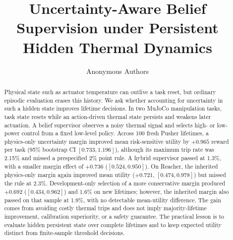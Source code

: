 \documentclass[10pt]{article}
\title{Uncertainty-Aware Belief Supervision under Persistent Hidden Thermal
Dynamics}
\author{Anonymous Authors}
\begin{document}
\maketitle

\begin{abstract}
Physical state such as actuator temperature can outlive a task reset, but
ordinary episodic evaluation erases this history. We ask whether accounting for
uncertainty in such a hidden state improves lifetime decisions. In two MuJoCo
manipulation tasks, task state resets while an action-driven thermal state
persists and weakens later actuation. A belief supervisor observes a noisy
thermal signal and selects high- or low-power control from a fixed low-level
policy. Across 100 fresh Pusher lifetimes, a physics-only uncertainty margin
improved mean risk-sensitive utility by $+0.965$ reward per task (95\%
bootstrap CI $[0.733,1.196]$), although its maximum trip rate was 2.15\% and
missed a prespecified 2\% point rule. A hybrid supervisor passed at 1.3\%, with
a smaller margin effect of $+0.736$ ($[0.524,0.950]$). On Reacher, the inherited
physics-only margin again improved mean utility ($+0.721$,
$[0.474,0.978]$) but missed the rule at 2.3\%. Development-only selection of a
more conservative margin produced $+0.692$ ($[0.434,0.962]$) and 1.6\% on new
lifetimes; however, the inherited margin also passed on that sample at 1.9\%,
with no detectable mean-utility difference. The gain comes from avoiding costly
thermal trips and does not imply majority-lifetime improvement, calibration
superiority, or a safety guarantee. The practical lesson is to evaluate hidden
persistent state over complete lifetimes and to keep expected utility distinct
from finite-sample threshold decisions.
\end{abstract}













\appendix

\end{document}
